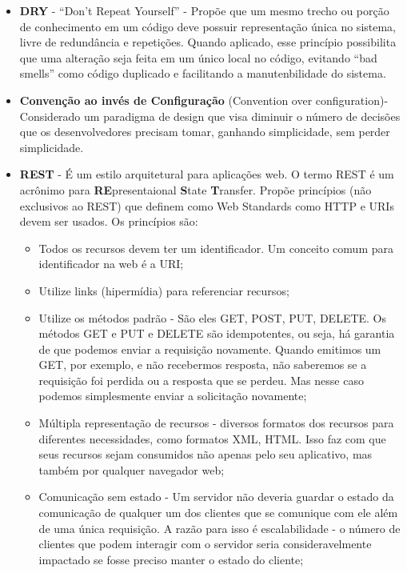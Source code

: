 \begin{itemize}

\item \textbf{DRY} - “Don’t Repeat Yourself” - Propõe que um mesmo trecho ou porção de
conhecimento em um código deve possuir representação única no sistema, livre de
redundância e repetições. Quando aplicado, esse princípio possibilita que uma alteração
seja feita em um único local no código, evitando “bad smells” como código duplicado e
facilitando a manutenbilidade do sistema.

\item \textbf{Convenção ao invés de Configuração} (Convention over configuration)- Considerado um paradigma de design que visa diminuir o número de decisões que os desenvolvedores precisam tomar, ganhando simplicidade, sem perder simplicidade.

\item \textbf{REST} - É um estilo arquitetural para aplicações web. O termo REST é um acrônimo para \textbf{RE}presentaional \textbf{S}tate \textbf{T}ransfer. Propõe princípios (não exclusivos ao REST) que definem como Web Standards como HTTP e URIs devem ser usados. Os princípios são:

  \begin{itemize}

  \item Todos os recursos devem ter um identificador. Um conceito comum para identificador na web é a URI;

  \item Utilize links (hipermídia) para referenciar recursos;

  \item Utilize os métodos padrão - São eles GET, POST, PUT, DELETE. Os métodos GET e PUT e DELETE são idempotentes, ou seja, há garantia de que podemos enviar a requisição novamente. Quando emitimos um GET, por exemplo, e não recebermos resposta, não saberemos se a requisição foi perdida ou a resposta que se perdeu. Mas nesse caso podemos simplesmente enviar a solicitação novamente;

  \item Múltipla representação de recursos - diversos formatos dos recursos para diferentes necessidades, como formatos XML, HTML. Isso faz com que seus recursos sejam consumidos não apenas pelo seu aplicativo, mas também por qualquer navegador web;

  \item Comunicação sem estado - Um servidor não deveria guardar o estado da comunicação de qualquer um dos clientes que se comunique com ele além de uma única requisição. A razão para isso é escalabilidade - o número de clientes que podem interagir com o servidor seria consideravelmente impactado se fosse preciso manter o estado do cliente;

  \end{itemize}
\end{itemize}

